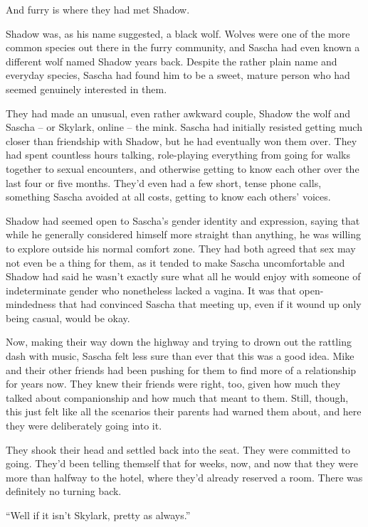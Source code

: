 And furry is where they had met Shadow.

Shadow was, as his name suggested, a black wolf. Wolves were one of the more common species out there in the furry community, and Sascha had even known a different wolf named Shadow years back. Despite the rather plain name and everyday species, Sascha had found him to be a sweet, mature person who had seemed genuinely interested in them.

They had made an unusual, even rather awkward couple, Shadow the wolf and Sascha -- or Skylark, online -- the mink. Sascha had initially resisted getting much closer than friendship with Shadow, but he had eventually won them over. They had spent countless hours talking, role-playing everything from going for walks together to sexual encounters, and otherwise getting to know each other over the last four or five months. They'd even had a few short, tense phone calls, something Sascha avoided at all costs, getting to know each others' voices.

Shadow had seemed open to Sascha's gender identity and expression, saying that while he generally considered himself more straight than anything, he was willing to explore outside his normal comfort zone. They had both agreed that sex may not even be a thing for them, as it tended to make Sascha uncomfortable and Shadow had said he wasn't exactly sure what all he would enjoy with someone of indeterminate gender who nonetheless lacked a vagina. It was that open-mindedness that had convinced Sascha that meeting up, even if it wound up only being casual, would be okay.

Now, making their way down the highway and trying to drown out the rattling dash with music, Sascha felt less sure than ever that this was a good idea. Mike and their other friends had been pushing for them to find more of a relationship for years now. They knew their friends were right, too, given how much they talked about companionship and how much that meant to them. Still, though, this just felt like all the scenarios their parents had warned them about, and here they were deliberately going into it.

They shook their head and settled back into the seat. They were committed to going. They'd been telling themself that for weeks, now, and now that they were more than halfway to the hotel, where they'd already reserved a room. There was definitely no turning back.

\secdiv{}

``Well if it isn't Skylark, pretty as always.''


